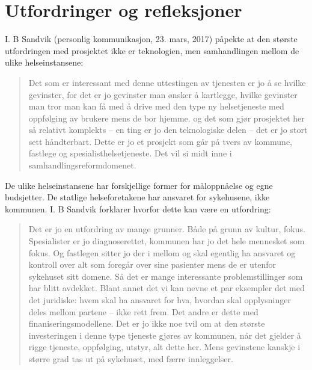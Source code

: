 \section{Utfordringer og refleksjoner}
I. B Sandvik (personlig kommunikasjon, 23. mars, 2017) påpekte at den største utfordringen med prosjektet ikke er teknologien, men samhandlingen mellom de ulike
helseinstansene:

\blockquote{Det som er interessant med denne uttestingen av tjenesten er jo å se hvilke gevinster, for det er jo gevinster man ønsker å kartlegge, hvilke gevinster man tror
    man kan få med å drive med den type ny helsetjeneste med oppfølging av brukere mens de bor hjemme. og det som gjør prosjektet her så relativt komplekts -- en ting
    er jo den teknologiske delen -- det er jo stort sett håndterbart. Dette er jo et prosjekt som går på tvers av kommune, fastlege og spesialisthelsetjeneste. Det vil
si midt inne i samhandlingsreformdomenet.}

De ulike helseinstansene har forskjellige former for måloppnåelse og egne budsjetter. De statlige helseforetakene har ansvaret for sykehusene,
ikke kommunen. I. B Sandvik forklarer hvorfor dette kan være en utfordring:

\blockquote{Det er jo en utfordring av mange grunner. Både på grunn av kultur, fokus. Spesialister er jo diagnoserettet, kommunen har jo det hele mennesket som fokus. Og
    fastlegen sitter jo der i mellom og skal egentlig ha ansvaret og kontroll over alt som foregår over sine pasienter mens de er utenfor sykehuset sitt domene. Så det er
    mange interessante problemstillinger som har blitt avdekket. Blant annet det vi kan nevne et par eksempler det med det juridiske: hvem skal ha ansvaret for hva,
    hvordan skal opplysninger deles mellom partene -- ikke rett frem. Det andre er dette med finaniseringsmodellene. Det er jo ikke noe tvil om at den største investeringen
    i denne type tjeneste gjøres av kommunen, når det gjelder å rigge tjeneste, oppfølging, utstyr, alt dette her. Mens gevinstene kanskje i større
grad tas ut på sykehuset, med færre innleggelser.}
